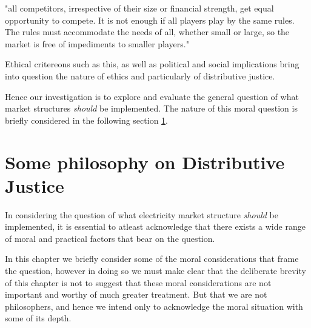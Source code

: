 "all competitors, irrespective of their size or financial strength, get equal opportunity to compete. It is not enough if all players play by the same rules. The rules must accommodate the needs of all, whether small or large, so the market is free of impediments to smaller players." \cite{australianenergymarketoperatorlimited2018}

Ethical critereons such as this, as well as political and social implications bring into question the nature of ethics and particularly of distributive justice.

Hence our investigation is to explore and evaluate the general question of what market structures \textit{should} be implemented.
The nature of this moral question is briefly considered in the following section \ref{sec:philosophy}.


\section{Some philosophy on Distributive Justice}\label{sec:philosophy}


In considering the question of what electricity market structure \textit{should} be implemented, it is essential to atleast acknowledge that there exists a wide range of moral and practical factors that bear on the question.

In this chapter we briefly consider some of the moral considerations that frame the question, however in doing so we must make clear that the deliberate brevity of this chapter is not to suggest that these moral considerations are not important and worthy of much greater treatment. But that we are not philosophers, and hence we intend only to acknowledge the moral situation with some of its depth.

